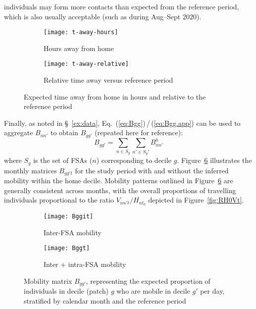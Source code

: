 individuals may form more contacts than expected from the reference period,
which is also usually acceptable (such as during Aug--Sept 2020).
\begin{figure}
  \centering
  \begin{subfigure}{0.4\linewidth}
    \texttt{[image: t-away-hours]}
    \caption{Hours away from home}
    \label{fig:W-hours}
  \end{subfigure}
  \begin{subfigure}{0.4\linewidth}
    \texttt{[image: t-away-relative]}
    \caption{Relative time away versus reference period}
    \label{fig:W-relative}
  \end{subfigure}
  \caption{Expected time away from home in hours and relative to the reference period}
  \label{fig:W}
\end{figure}
\par
Finally, as noted in \S~\ref{ex:data}, Eq.~(\ref{eq:Bgg})\,/\,(\ref{eq:Bgg.app})
can be used to aggregate $B_{nn'}$ to obtain $B_{gg'}$ (repeated here for reference):
\begin{equation}\label{eq:Bgg.app}
  B_{gg'} = \sum_{n \in S_g}\sum_{n' \in S_g'} B^h_{nn'}
\end{equation}
where $S_g$ is the set of FSAs ($n$) corresponding to decile $g$.
Figure~\ref{fig:Bggt} illustrates the monthly matrices $B_{gg't}$ for the study period
with and without the inferred mobility within the home decile.
Mobility patterns outlined in Figure~\ref{fig:Bggt} are generally consistent across months,
with the overall proportions of travelling individuals
proportional to the ratio $V_{nn't} / H_{nt_0}$ depicted in Figure~\ref{fig:RH0Vt}.
\begin{figure}[ht]
  \centering
  \begin{subfigure}{\linewidth}
    \texttt{[image: Bggit]}
    \caption{Inter-FSA mobility}
    \label{fig:Bggot}
  \end{subfigure}
  \begin{subfigure}{\linewidth}
    \texttt{[image: Bggt]}
    \caption{Inter + intra-FSA mobility}
    \label{fig:Bggdt}
  \end{subfigure}
  \caption{Mobility matrix $B_{gg'}$, representing
    the expected proportion of individuals in decile (patch) $g$
    who are mobile in decile $g'$ per day,
    stratified by calendar month and the reference period}
  \label{fig:Bggt}
\end{figure}
\clearpage
